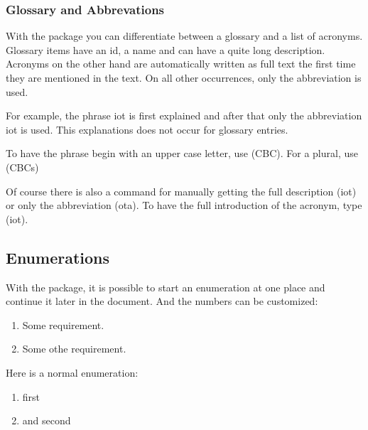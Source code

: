 \subsubsection{Glossary and Abbrevations}
With the  package you can differentiate between a glossary and a list of acronyms.
Glossary items have an id, a name and can have a quite long description.
Acronyms on the other hand are automatically written as full text the first time they are mentioned in the text.
On all other occurrences, only the abbreviation is used.



For example, the phrase \gls{iot} is first explained and after that only the abbreviation \gls{iot} is used.
This explanations does not occur for glossary entries.

To have the phrase begin with an upper case letter, use  (\Gls{CBC}).
For a plural, use  (\glspl{CBC})

Of course there is also a command for manually getting the full description  (\acrlong{iot}) or only the abbreviation  (\acrshort{ota}).
To have the full introduction of the acronym, type  (\acrfull{iot}).


\subsection{Enumerations}
With the  package, it is possible to start an enumeration at one place and continue it later in the document.
And the numbers can be customized:

\begin{enumerate}[label=\textbf{R\arabic*},rightmargin=0.7cm,series=basicreq]
\item \label{req:example1}
Some requirement.
\item \label{req:example2}
Some othe requirement.
\end{enumerate}

Here is a normal enumeration:
\begin{enumerate}
    \item first
    \item and second
\end{enumerate}

